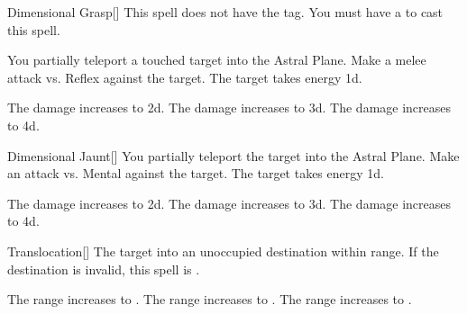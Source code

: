 \lowercase{\hypertarget{spell:Dimensional Grasp}{}}\label{spell:Dimensional Grasp}
\begin{freeability}[Rank 1]{\hypertarget{spell:Dimensional Grasp}{Dimensional Grasp}}[]
This spell does not have the  tag.
You must have a  to cast this spell.

You partially teleport a touched target into the Astral Plane.
Make a melee attack vs. Reflex against the target.
\hit The target takes energy  \plus1d.

\rankline
{} The damage increases to  \plus2d.
 The damage increases to  \plus3d.
 The damage increases to  \plus4d.
\end{freeability}
\vspace{0.25em}



\lowercase{\hypertarget{spell:Dimensional Jaunt}{}}\label{spell:Dimensional Jaunt}
\begin{freeability}[Rank 1]{\hypertarget{spell:Dimensional Jaunt}{Dimensional Jaunt}}[]
You partially teleport the target into the Astral Plane.
Make an attack vs. Mental against the target.
\hit The target takes energy  \plus1d.

\rankline
{} The damage increases to  \plus2d.
 The damage increases to  \plus3d.
 The damage increases to  \plus4d.
\end{freeability}
\vspace{0.25em}



\lowercase{\hypertarget{spell:Translocation}{}}\label{spell:Translocation}
\begin{freeability}[Rank 1]{\hypertarget{spell:Translocation}{Translocation}}[]
The target  into an unoccupied destination within range.
If the destination is invalid, this spell is .

\rankline
{} The range increases to \rngmed.
 The range increases to \rnglong.
 The range increases to \rngext.
\end{freeability}
\vspace{0.25em}



